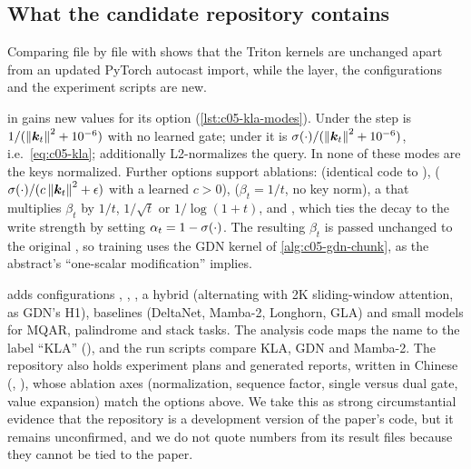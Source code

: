 \subsection{What the candidate repository contains}\label{sec:c05-kla-repo}

\begin{sloppypar}
Comparing  file by file with
 shows that the Triton kernels are unchanged apart from an updated
PyTorch autocast import, while the layer, the configurations and the experiment scripts are new.
\end{sloppypar}

\begin{implnote}[title={In the code: Kaczmarz-specific changes in the candidate repository}]
 in
 gains new
values for its  option (\cref{lst:c05-kla-modes}). Under  the step is
$1/(\left\lVert \bm{k}_t\right\rVert^2 + 10^{-6})$ with no learned gate; under  it is
$\sigma(\cdot)/(\left\lVert \bm{k}_t\right\rVert^2 + 10^{-6})$, i.e.\ \cref{eq:c05-kla}; 
additionally L2-normalizes the query. In none of these modes are the keys normalized. Further
options support ablations:  (identical code to ),
 ($\sigma(\cdot)/(c\left\lVert \bm{k}_t\right\rVert^2 + \epsilon)$ with a learned $c > 0$),
 ($\beta_t = 1/t$, no key norm), a  that multiplies $\beta_t$
by $1/t$, $1/\sqrt t$ or $1/\log(1+t)$, and , which ties the decay to the write strength by setting
$\alpha_t = 1 - \sigma(\cdot)$. The resulting $\beta_t$ is passed unchanged to the original
, so training uses the GDN kernel of \cref{alg:c05-gdn-chunk}, as the
abstract's ``one-scalar modification'' implies.

 adds configurations
, , , a hybrid
 (alternating with 2K sliding-window attention, as GDN's H1),
baselines (DeltaNet, Mamba-2, Longhorn, GLA) and small models for MQAR, palindrome and stack
tasks. The analysis code maps the name  to the label ``KLA''
(), and the run
scripts compare KLA, GDN and Mamba-2. The repository also holds experiment plans and generated
reports, written in Chinese (,
), whose ablation axes (normalization,
sequence factor, single versus dual gate, value expansion) match the options above. We take this
as strong circumstantial evidence that the repository is a development version of the paper's
code, but it remains unconfirmed, and we do not quote numbers from its result files because they
cannot be tied to the paper.
\end{implnote}

